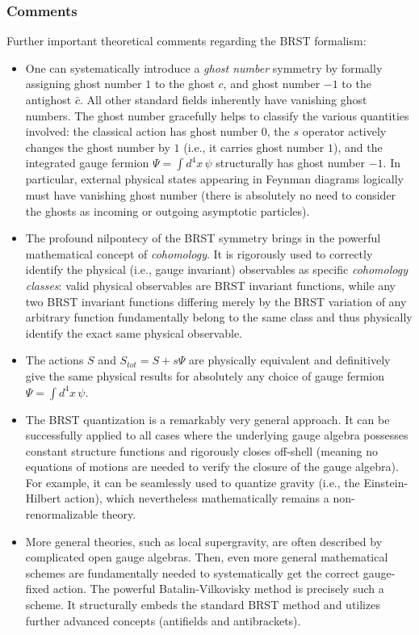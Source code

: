 \subsubsection{Comments}

Further important theoretical comments regarding the BRST formalism:
\begin{itemize}
    \item One can systematically introduce a \textit{ghost number} symmetry by formally assigning ghost number \(1\) to the ghost \(c\), and ghost number \(-1\) to the antighost \(\bar{c}\). All other standard fields inherently have vanishing ghost numbers. The ghost number gracefully helps to classify the various quantities involved: the classical action has ghost number \(0\), the \(s\) operator actively changes the ghost number by \(1\) (i.e., it carries ghost number \(1\)), and the integrated gauge fermion \(\Psi = \int d^4x \, \psi\) structurally has ghost number \(-1\). In particular, external physical states appearing in Feynman diagrams logically must have vanishing ghost number (there is absolutely no need to consider the ghosts as incoming or outgoing asymptotic particles).
    \item The profound nilpontecy of the BRST symmetry brings in the powerful mathematical concept of \textit{cohomology}. It is rigorously used to correctly identify the physical (i.e., gauge invariant) observables as specific \textit{cohomology classes}: valid physical observables are BRST invariant functions, while any two BRST invariant functions differing merely by the BRST variation of any arbitrary function fundamentally belong to the same class and thus physically identify the exact same physical observable.
    \item The actions \(S\) and \(S_{tot} = S + s\Psi\) are physically equivalent and definitively give the same physical results for absolutely any choice of gauge fermion \(\Psi = \int d^4x \, \psi\).
    \item The BRST quantization is a remarkably very general approach. It can be successfully applied to all cases where the underlying gauge algebra possesses constant structure functions and rigorously closes off-shell (meaning no equations of motions are needed to verify the closure of the gauge algebra). For example, it can be seamlessly used to quantize gravity (i.e., the Einstein-Hilbert action), which nevertheless mathematically remains a non-renormalizable theory.
    \item More general theories, such as local supergravity, are often described by complicated open gauge algebras. Then, even more general mathematical schemes are fundamentally needed to systematically get the correct gauge-fixed action. The powerful Batalin-Vilkovisky method is precisely such a scheme. It structurally embeds the standard BRST method and utilizes further advanced concepts (antifields and antibrackets).
\end{itemize}








